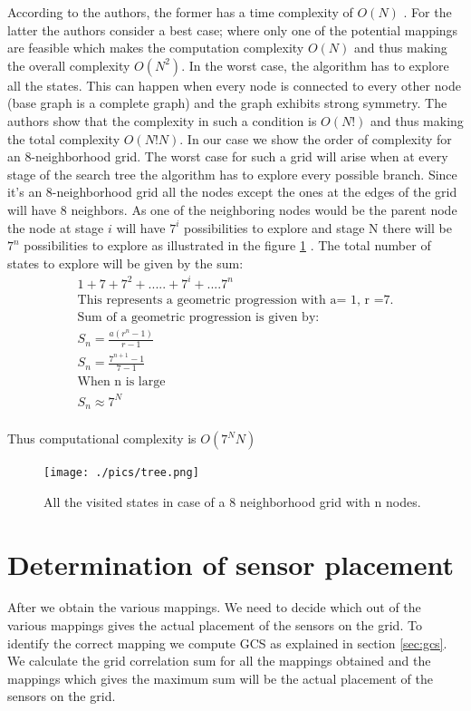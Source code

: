 According to the authors, the former has a time complexity of $O(N)$ . For the latter the authors consider a best case; where only one of the potential mappings are feasible which makes the computation complexity $O(N)$ and thus making the overall complexity $O(N^2)$. In the worst case, the algorithm has to explore all the states. This can happen when every node is connected to every other node (base graph is a complete graph) and the graph exhibits strong symmetry. The authors show that the complexity in such a condition is $O(N!)$ and thus making the total complexity $O(N!N)$.
In our case we show the order of complexity for an 8-neighborhood grid. The worst case for such a grid will arise when at every stage of the search tree the algorithm has to explore every possible branch. Since it's an 8-neighborhood grid all the nodes except the ones at the edges of the grid will have 8 neighbors. As one of the neighboring nodes would be the parent node the node at stage $i$ will have $7^{i}$ possibilities to explore and stage N there will be $7^n$ possibilities to explore as illustrated in the figure \ref{fig:ccO} . The total number of states to explore will be given by the sum:\\

\begin{align*}
1 + 7 + 7^2+ . . . . .+7^i+....7^n\\
\text{This represents a geometric progression with a= 1, r =7.}\\
\text{Sum of a geometric progression is given by:}\\
S_{n}=\frac{a(r^n-1)}{r-1}\\
S_{n}=\frac{7^{n+1} -1}{7-1} \\
\text{When n is large}\\
S_{n} \approx 7^N\\
\end{align*}

Thus computational complexity is $O(7^NN)$

\begin{figure}[!ht]
\texttt{[image: ./pics/tree.png]}
\caption{All the visited states in case of a 8 neighborhood grid with n nodes.}
\label{fig:ccO}

\end{figure}

\section{Determination of sensor placement}
\label{ref:rotationalSym}
After we obtain the various mappings. We need to decide which out of the various mappings gives the actual placement of the sensors on the grid. To identify the correct mapping we compute GCS as explained in section \ref{sec:gcs}. We calculate the grid correlation sum for all the mappings obtained and the mappings which gives the maximum sum will be the actual placement of the sensors on the grid. 
